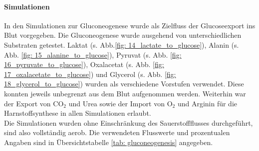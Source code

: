 \paragraph{Simulationen}
In den Simulationen zur Gluconeogenese wurde als Zielfluss der Glucoseexport ins Blut vorgegeben. Die Gluconeogenese wurde ausgehend von unterschiedlichen Substraten getestet. Laktat (s. Abb.\ref{fig: 14_lactate_to_glucose}), Alanin (s. Abb. \ref{fig: 15_alanine_to_glucose}), Pyruvat (s. Abb. \ref{fig: 16_pyruvate_to_glucose}), Oxalacetat (s. Abb. \ref{fig: 17_oxalacetate_to_glucose}) und Glycerol (s. Abb. \ref{fig: 18_glycerol_to_glucose}) wurden als verschiedene Vorstufen verwendet. Diese konnten jeweils unbegrenzt aus dem Blut aufgenommen werden. Weiterhin war der Export von $\text{CO}_2$ und Urea sowie der Import von $\text{O}_2$ und Arginin für die Harnstoffsynthese in allen Simulationen erlaubt.\\
Die Simulationen wurden ohne Einschränkung des Sauerstoffflusses durchgeführt, sind also vollständig aerob. Die verwendeten Flusswerte und prozentualen Angaben sind in Übersichtstabelle \ref{tab: gluconeogenesis} angegeben.

